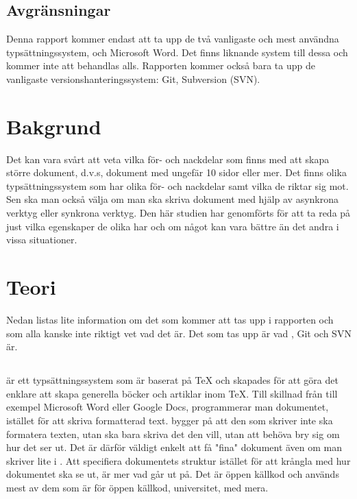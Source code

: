 \subsection{Avgränsningar}
Denna rapport kommer endast att ta upp de två vanligaste och mest användna typsättningssystem, \latex och Microsoft Word. Det finns liknande system till dessa och kommer inte att behandlas alls. Rapporten kommer också bara ta upp de vanligaste versionshanteringssystem: Git, Subversion (SVN).

\section{Bakgrund}
\label{sec:background-tuhkala}
Det kan vara svårt att veta vilka för- och nackdelar som finns med att skapa större dokument, d.v.s, dokument med ungefär 10 sidor eller mer. Det finns olika typsättningssystem som har olika för- och nackdelar samt vilka de riktar sig mot. Sen ska man också välja om man ska skriva dokument med hjälp av asynkrona verktyg eller synkrona verktyg. Den här studien har genomförts för att ta reda på just vilka egenskaper de olika har och om något kan vara bättre än det andra i vissa situationer.

\section{Teori}
\label{sec:theory-tuhkala}
Nedan listas lite information om det som kommer att tas upp i rapporten och som alla kanske inte riktigt vet vad det är. Det som tas upp är vad \latex, Git och SVN är.

\subsection{\latex}
\latex är ett typsättningssystem som är baserat på TeX och skapades för att göra det enklare att skapa generella böcker och artiklar inom TeX. Till skillnad från till exempel Microsoft Word eller Google Docs, programmerar man dokumentet, istället för att skriva formatterad text. \latex bygger på att den som skriver inte ska formatera texten, utan ska bara skriva det den vill, utan att behöva bry sig om hur det ser ut.  Det är därför väldigt enkelt att få "fina" dokument även om man skriver lite i \latex. Att specifiera dokumentets struktur istället för att krångla med hur dokumentet ska se ut, är mer vad \latex går ut på. Det är öppen källkod och används mest av dem som är för öppen källkod, universitet, med mera.

